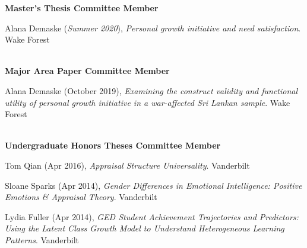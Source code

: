 {\large \textbf{Master's Thesis Committee Member}}%
\begin{etaremune}%
\item Alana Demaske (\textit{Summer 2020}), \textit{Personal growth initiative and need satisfaction}. Wake Forest%
\end{etaremune}\\

{\large \textbf{Major Area Paper Committee Member}}%
\begin{etaremune}%
\item Alana Demaske (October 2019), \textit{Examining the construct validity and functional utility of personal growth initiative in a war-affected Sri Lankan sample}. Wake Forest%
\end{etaremune}\\
%
{\large \textbf{Undergraduate Honors Theses Committee Member}}
\begin{etaremune}\item Tom Qian (Apr 2016), \textit{Appraisal Structure Universality}. Vanderbilt%
%
\item Sloane Sparks (Apr 2014), \textit{Gender Differences in Emotional Intelligence: Positive Emotions \& Appraisal Theory}. Vanderbilt%
\item Lydia Fuller (Apr 2014), \textit{GED Student Achievement Trajectories and Predictors: Using the Latent Class Growth Model to Understand Heterogeneous Learning Patterns}. Vanderbilt%
\end{etaremune}
